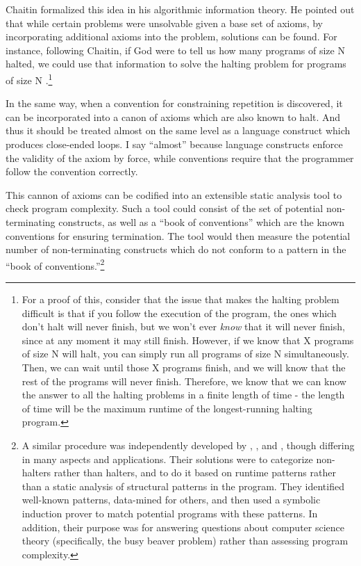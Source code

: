 Chaitin formalized this idea in his algorithmic information theory.  He pointed out that while certain problems were unsolvable given a base set of axioms, by incorporating additional axioms into the problem, solutions can be found.  For instance, following Chaitin, if God were to tell us how many programs of size N halted, we could use that information to solve the halting problem for programs of size N \citep{chaitin}.\footnote{For a proof of this, consider that the issue that makes the halting problem difficult is that if you follow the execution of the program, the ones which don't halt will never finish, but we won't ever \emph{know} that it will never finish, since at any moment it may still finish.  However, if we know that X programs of size N will halt, you can simply run all programs of size N simultaneously.  Then, we can wait until those X programs finish, and we will know that the rest of the programs will never finish.  Therefore, we know that we can know the answer to all the halting problems in a finite length of time - the length of time will be the maximum runtime of the longest-running halting program.}

In the same way, when a convention for constraining repetition is discovered, it can be incorporated into a canon of axioms which are also known to halt.  And thus it should be treated almost on the same level as a language construct which produces close-ended loops.  I say ``almost'' because language constructs enforce the validity of the axiom by force, while conventions require that the programmer follow the convention correctly.

This cannon of axioms can be codified into an extensible static analysis tool to check program complexity.  Such a tool could consist of the set of potential non-terminating constructs, as well as a ``book of conventions'' which are the known conventions for ensuring termination.  The tool would then measure the potential number of non-terminating constructs which do not conform to a pattern in the ``book of conventions.''\footnote{A similar procedure was independently developed by \citet{bringsjord}, \citet{hertel}, and \citet{harland}, though differing in many aspects and applications.  Their solutions were to categorize non-halters rather than halters, and to do it based on runtime patterns rather than a static analysis of structural patterns in the program.  They identified well-known patterns, data-mined for others, and then used a symbolic induction prover to match potential programs with these patterns. In addition, their purpose was for answering questions about computer science theory (specifically, the busy beaver problem) rather than assessing program complexity.}

